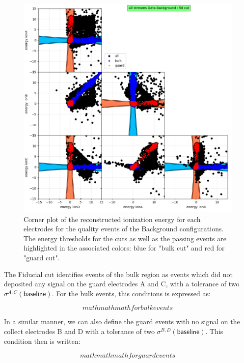 \begin{figure}
\centering
\includegraphics[width=\linewidth,]{Figures/Neutron/fid_cut.png}
\caption{Corner plot of the reconstructed ionization energy for each electrodes for the quality events of the Background configurations. The energy thresholds for the cuts as well as the passing events are highlighted in the associated colors: blue for "bulk cut" and red for "guard cut".}
\label{fig:fiducial-cut}
\end{figure}

The Fiducial cut identifies events of the bulk region as events which did not deposited any signal on the guard electrodes A and C, with a tolerance of two $\sigma^{A,C}\left( \textsf{baseline} \right)$. For the bulk events, this conditions is expressed as:

\begin{equation}
mathmathmath for bulk events
\end{equation}

In a similar manner, we can also define the guard events with no signal on the collect electrodes B and D with a tolerance of two $\sigma^{B,D}\left( \textsf{baseline} \right)$. This condition then is written:

\begin{equation}
mathmathmath for guard events
\end{equation}

